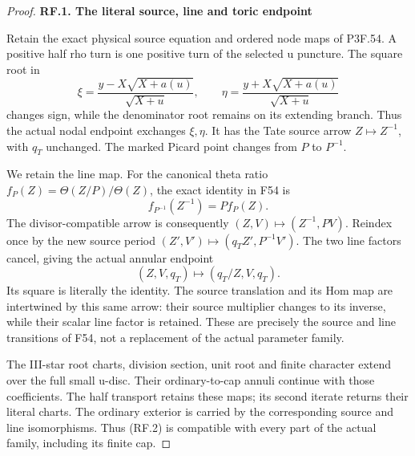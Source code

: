 \begin{proof}
\par

\medskip\noindent\textbf{RF.1. The literal source, line and toric endpoint}

\par\nobreak

Retain the exact physical source equation and ordered node maps of
P3F.54. A positive half rho turn is one positive turn of the selected
u puncture. The square root in
\[
 \xi=\frac{y-X\sqrt{X+a(u)}}{\sqrt{X+u}},\qquad
 \eta=\frac{y+X\sqrt{X+a(u)}}{\sqrt{X+u}}
\]
changes sign, while the denominator root remains on its extending
branch. Thus the actual nodal endpoint exchanges \(\xi,\eta\).
It has the Tate source arrow \(Z\mapsto Z^{-1}\), with \(q_T\)
unchanged. The marked Picard point changes from \(P\) to
\(P^{-1}\).

We retain the line map. For the canonical theta ratio
\(f_P(Z)=\Theta(Z/P)/\Theta(Z)\), the exact identity in F54 is
\[
                   f_{P^{-1}}(Z^{-1})=P f_P(Z).
                                                               \tag{RF.1}
\]
The divisor-compatible arrow is consequently
\((Z,V)\mapsto(Z^{-1},PV)\). Reindex once by the new source
period \((Z',V')\mapsto(q_TZ',P^{-1}V')\). The two line factors
cancel, giving the actual annular endpoint
\[
                   (Z,V,q_T)\longmapsto(q_T/Z,V,q_T).
                                                               \tag{RF.2}
\]
Its square is literally the identity. The source translation and
its Hom map are intertwined by this same arrow: their source
multiplier changes to its inverse, while their scalar line factor
is retained. These are precisely the source and line transitions
of F54, not a replacement of the actual parameter family.

The III-star root charts, division section, unit root and finite
character extend over the full small u-disc. Their ordinary-to-cap
annuli continue with those coefficients. The half transport retains
these maps; its second iterate returns their literal charts. The
ordinary exterior is carried by the corresponding source and line
isomorphisms. Thus (RF.2) is compatible with every part of the actual
family, including its finite cap.


\end{proof}
